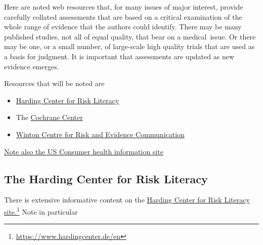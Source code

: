 \documentclass[
  10pt,
  b5paper]{book}
\providecommand{\tightlist}{%
  \setlength{\itemsep}{0pt}\setlength{\parskip}{0pt}}
\begin{document}
Here are noted web resources that, for many issues of major interest,
provide carefully collated assessments that are based on a critical
examination of the whole range of evidence that the authors could
identify. There may be many published studies, not all of equal quality,
that bear on a medical~issue. Or there may be one, or a small number, of
large-scale high quality trials that are used as a basis for judgment.
It is important that assessments are updated as new evidence emerges.

Resources that will be noted are

\begin{itemize}
\tightlist
\item
  \href{https://www.hardingcenter.de/en}{Harding Center for Risk Literacy}
\item
  The \href{https://www.cochrane.org/}{Cochrane Center}
\item
  \href{https://wintoncentre.maths.cam.ac.uk/}{Winton Centre for Risk and Evidence
  Communication}
\end{itemize}

\href{https://medlineplus.gov/}{Note also the US Consumer health information
site}

\hypertarget{the-harding-center-for-risk-literacy}{%
\subsection*{The Harding Center for Risk Literacy}\label{the-harding-center-for-risk-literacy}}

There is extensive informative content on the \href{https://www.hardingcenter.de/en}{Harding Center for Risk
Literacy site.}\footnote{\url{https://www.hardingcenter.de/en}} Note in
particular
\end{document}
